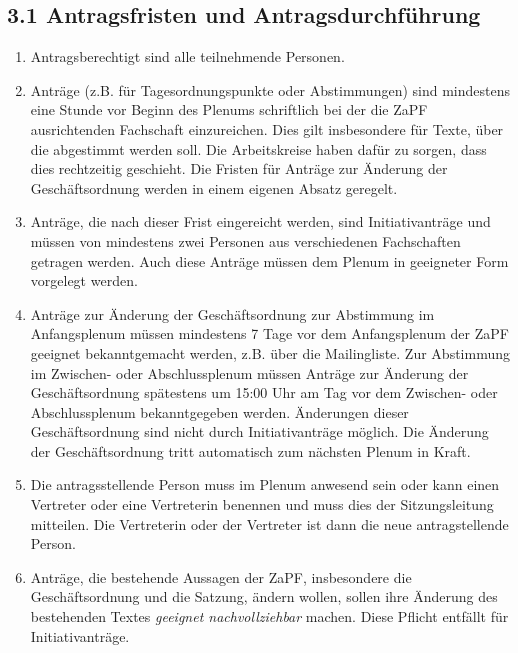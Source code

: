 \documentclass[12pt,oneside]{scrartcl}
\begin{document}
\subsection{3.1 Antragsfristen und Antragsdurchführung%
  \label{antragsfristen-und-antragsdurchfuhrung}%
}

\begin{enumerate}
\item Antragsberechtigt sind alle teilnehmende Personen.

\item Anträge (z.B. für Tagesordnungspunkte oder Abstimmungen) sind mindestens
eine Stunde vor Beginn des Plenums schriftlich bei der die ZaPF
ausrichtenden Fachschaft einzureichen.
Dies gilt insbesondere für Texte, über die abgestimmt werden soll.
Die Arbeitskreise haben dafür zu sorgen, dass dies rechtzeitig geschieht.
Die Fristen für Anträge zur Änderung der Geschäftsordnung werden in einem
eigenen Absatz geregelt.

\item Anträge, die nach dieser Frist eingereicht werden, sind Initiativanträge
und müssen von mindestens zwei Personen aus verschiedenen Fachschaften
getragen werden. Auch diese Anträge müssen dem Plenum in geeigneter Form
vorgelegt werden.

\item Anträge zur Änderung der Geschäftsordnung zur Abstimmung im Anfangsplenum
müssen mindestens 7 Tage vor dem Anfangsplenum der ZaPF geeignet
bekanntgemacht werden, z.B. über die Mailingliste.
Zur Abstimmung im Zwischen- oder Abschlussplenum müssen Anträge zur Änderung
der Geschäftsordnung spätestens um 15:00 Uhr am Tag vor dem Zwischen- oder
Abschlussplenum bekanntgegeben werden.
Änderungen dieser Geschäftsordnung sind nicht durch Initiativanträge möglich.
Die Änderung der Geschäftsordnung tritt automatisch zum nächsten Plenum in Kraft.

\item Die antragsstellende Person muss im Plenum anwesend sein
oder kann einen Vertreter oder eine Vertreterin benennen und muss dies
der Sitzungsleitung mitteilen.
Die Vertreterin oder der Vertreter ist dann die neue antragstellende Person.

\item Anträge, die bestehende Aussagen der ZaPF, insbesondere die Geschäftsordnung
und die Satzung, ändern wollen, sollen ihre Änderung des bestehenden Textes
\emph{geeignet nachvollziehbar} machen.
Diese Pflicht entfällt für Initiativanträge.
\end{enumerate}
\end{document}
